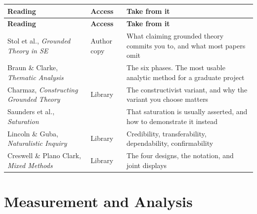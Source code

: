 \begin{center}
\small
\begin{longtable}{@{}L{4.4cm}L{1.8cm}L{7.6cm}@{}}
\toprule
\textbf{Reading} & \textbf{Access} & \textbf{Take from it} \\
\midrule
\endfirsthead
\toprule
\textbf{Reading} & \textbf{Access} & \textbf{Take from it} \\
\midrule
\endhead
\bottomrule
\endfoot
Stol et al., \emph{Grounded Theory in SE}~\cite{stol2016grounded}
  & Author copy
  & What claiming grounded theory commits you to, and what most papers omit \\
Braun \& Clarke, \emph{Thematic Analysis}~\cite{braun2006using}
  & \oa{}
  & The six phases. The most usable analytic method for a graduate project \\
Charmaz, \emph{Constructing Grounded Theory}~\cite{charmaz2014constructing}
  & Library
  & The constructivist variant, and why the variant you choose matters \\
Saunders et al., \emph{Saturation}~\cite{saunders2018saturation}
  & \oa{}
  & That saturation is usually asserted, and how to demonstrate it instead \\
Lincoln \& Guba, \emph{Naturalistic Inquiry}~\cite{lincoln1985naturalistic}
  & Library
  & Credibility, transferability, dependability, confirmability \\
Creswell \& Plano Clark, \emph{Mixed Methods}~\cite{creswell2018designing}
  & Library
  & The four designs, the notation, and joint displays \\
\end{longtable}
\end{center}

\section{Measurement and Analysis}

